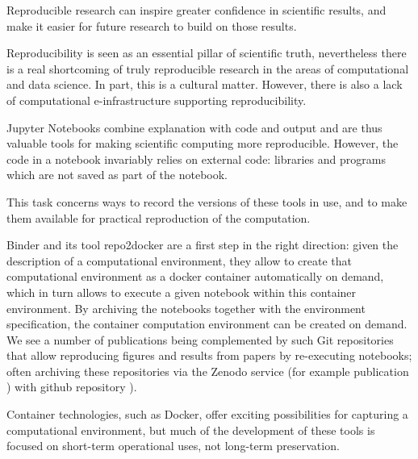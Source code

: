 \begin{task}[
  title=Archiving software environments for reproducible computation,
  id=reproducibility,
  lead=XFEL,
  PM=42,
  wphases={0-36},
  partners={EGI,QS,SRL,UPSUD,WTT}
]

  Reproducible research can inspire greater confidence in scientific results,
  and make it easier for future research to build on those results.

  Reproducibility is seen as an essential pillar of scientific truth,
  nevertheless there is a real shortcoming of truly reproducible
  research in the areas of computational and data science. In part,
  this is a cultural matter. However, there is also a lack of
  computational e-infrastructure supporting reproducibility.
  \medskip

  Jupyter Notebooks combine explanation with code and output and are
  thus valuable tools for making scientific computing more
  reproducible. However, the code in a notebook invariably relies on
  external code: libraries and programs which are not saved as part of
  the notebook.

  This task concerns ways to record the versions of these tools in use, and to
  make them available for practical reproduction of the computation.

  Binder and its tool repo2docker are a first step in the right
  direction: given the description of a computational environment,
  they allow to create that computational environment as a docker
  container automatically on demand, which in turn allows to execute a
  given notebook within this container environment. By archiving the
  notebooks together with the environment specification, the container
  computation environment can be created on demand. We see a number of
  publications being complemented by such Git repositories that allow
  reproducing figures and results from papers by re-executing
  notebooks; often archiving these repositories via the Zenodo
  service (for example publication \cite{CortsOrtuo2018}) with github
  repository \cite{GitHubRepoExampleCortes2018}).

  Container technologies, such as Docker, offer exciting possibilities
  for capturing a computational environment, but much of the
  development of these tools is focused on short-term operational
  uses, not long-term preservation.


\end{task}
